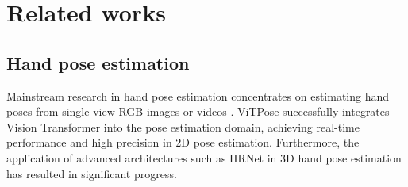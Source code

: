 \section{Related works}
\label{sec:related}

\subsection{Hand pose estimation}

Mainstream research in hand pose estimation concentrates on estimating hand poses from single-view RGB images or videos \cite{mmpose2020,Lugaresi2019MediaPipeAF,xu2022vitpose,xu2022vitpose+,Hampali_2022_CVPR_Kypt_Trans,10.1109/TPAMI.2023.3247907,10655481,10.1007/978-3-031-20068-7_22,moon_bringing_2023,blur_oh2023recovering3dhandmesh,ego_Prakash2024Hands,lin_pre-training_2024,spurr_peclr_2022}. ViTPose\cite{xu2022vitpose,xu2022vitpose+} successfully integrates Vision Transformer\cite{vit_dosovitskiy2021an} into the pose estimation domain, achieving real-time performance and high precision in 2D pose estimation. Furthermore, the application of advanced architectures such as HRNet\cite{hrnet_sun2019deep,mmpose2020} in 3D hand pose estimation has resulted in significant progress.

